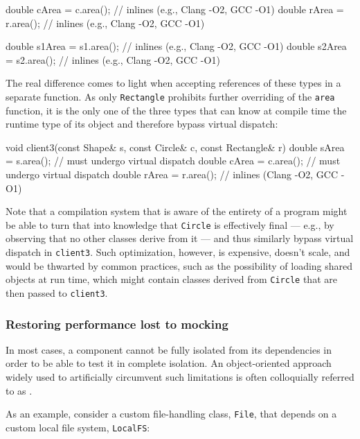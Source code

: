 {{\begin{emcppslisting}[emcppsbatch=e4]
{    double cArea = c.area();  // inlines (e.g., Clang -O2, GCC -O1)
    double rArea = r.area();  // inlines (e.g., Clang -O2, GCC -O1)

    double s1Area = s1.area();  // inlines (e.g., Clang -O2, GCC -O1)
    double s2Area = s2.area();  // inlines (e.g., Clang -O2, GCC -O1)
}
\end{emcppslisting}
    

\noindent The real difference comes to light when accepting references of these
types in a separate function. As only \lstinline!Rectangle! prohibits
further overriding of the \lstinline!area! function, it is the only one of
the three types that can know at compile time the runtime type of its
object and therefore bypass virtual dispatch:

\begin{emcppslisting}[emcppsbatch=e4]
void client3(const Shape& s, const Circle& c, const Rectangle& r)
{
    double sArea = s.area();  // must undergo virtual dispatch
    double cArea = c.area();  // must undergo virtual dispatch
    double rArea = r.area();  // inlines (Clang -O2, GCC -O1)
}
\end{emcppslisting}
    

\noindent Note that a compilation system that is aware of the entirety of a
program might be able to turn that into knowledge that \lstinline!Circle!
is effectively final --- e.g., by observing that no other classes derive
from it --- and thus similarly bypass virtual dispatch in
\lstinline!client3!. Such optimization, however, is expensive, doesn't
scale, and would be thwarted by common practices, such as the
possibility of loading shared objects at run time, which might contain
classes derived from \lstinline!Circle! that are then passed to
\lstinline!client3!.

\subsubsection[Restoring performance lost to mocking]{Restoring performance lost to mocking}\label{restoring-performance-lost-to-mocking}

In most cases, a component cannot be fully isolated from its
dependencies in order to be able to test it in complete isolation. An
object-oriented approach widely used to artificially circumvent such
limitations is often colloquially referred to as .

As an example, consider a custom file-handling class, \lstinline!File!,
that depends on a custom local file system, \lstinline!LocalFS!:

}}
